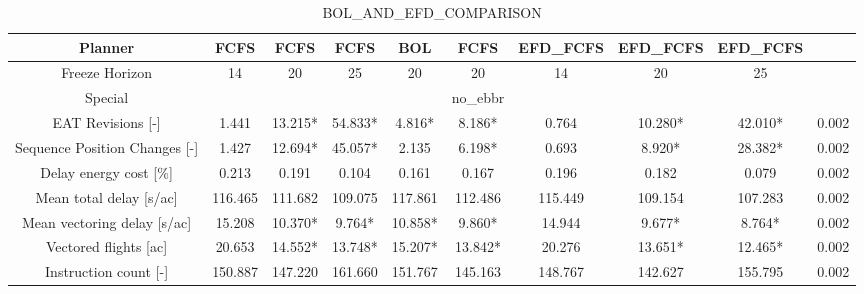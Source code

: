 \begin{table}[htbp]
\caption{BOL\_AND\_EFD\_COMPARISON}
\begin{center}
\footnotesize
\setlength{\tabcolsep}{3pt}
\renewcommand{\arraystretch}{1.000}
\begin{tabular}{|c|c|c|c|c|c|c|c|c|c|}
\hline
Planner & FCFS & FCFS & FCFS & BOL & FCFS & EFD\_FCFS & EFD\_FCFS & EFD\_FCFS &  \\
\hline
Freeze Horizon & 14 & 20 & 25 & 20 & 20 & 14 & 20 & 25 &  \\
\hline
Special &  &  &  &  & no\_ebbr &  &  &  &  \\
\hline
EAT Revisions [-] & 1.441 & 13.215* & 54.833* & 4.816* & 8.186* & 0.764 & 10.280* & 42.010* & 0.002 \\
\hline
Sequence Position Changes [-] & 1.427 & 12.694* & 45.057* & 2.135 & 6.198* & 0.693 & 8.920* & 28.382* & 0.002 \\
\hline
Delay energy cost [\%] & 0.213 & 0.191 & 0.104 & 0.161 & 0.167 & 0.196 & 0.182 & 0.079 & 0.002 \\
\hline
Mean total delay [s/ac] & 116.465 & 111.682 & 109.075 & 117.861 & 112.486 & 115.449 & 109.154 & 107.283 & 0.002 \\
\hline
Mean vectoring delay [s/ac] & 15.208 & 10.370* & 9.764* & 10.858* & 9.860* & 14.944 & 9.677* & 8.764* & 0.002 \\
\hline
Vectored flights [ac] & 20.653 & 14.552* & 13.748* & 15.207* & 13.842* & 20.276 & 13.651* & 12.465* & 0.002 \\
\hline
Instruction count [-] & 150.887 & 147.220 & 161.660 & 151.767 & 145.163 & 148.767 & 142.627 & 155.795 & 0.002 \\
\hline
\end{tabular}
\label{tab:bol\_and\_efd\_comparison}
\end{center}
\end{table}